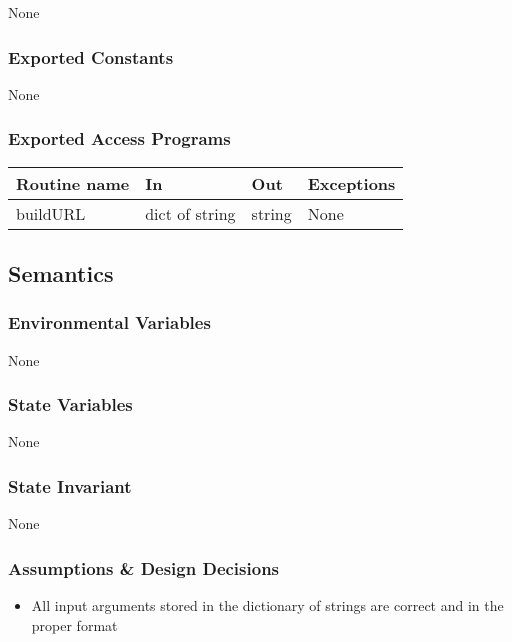 \documentclass{article}
\begin{document}
None

\subsubsection* {Exported Constants}

None

\subsubsection* {Exported Access Programs}

\begin{tabular}{| l | l | l | p{5cm} |}
\hline
\textbf{Routine name} & \textbf{In} & \textbf{Out} & \textbf{Exceptions}\\
\hline
buildURL & dict of string & string & None\\
\hline

\end{tabular}

\subsection* {Semantics}

\subsubsection* {Environmental Variables}

None

\subsubsection* {State Variables}

None

\subsubsection* {State Invariant}

None

\subsubsection* {Assumptions \& Design Decisions}

\begin{itemize}
\item All input arguments stored in the dictionary of strings are correct and in the proper format
\end{itemize}
\end{document}

